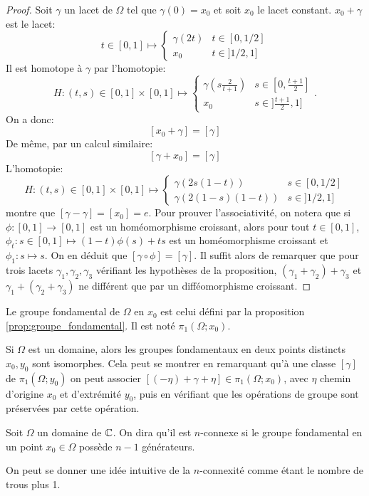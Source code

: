 \begin{proof}
Soit $\gamma$ un lacet de $\Omega$ tel que $\gamma(0)=x_0$ et soit $x_0$ le lacet constant. $x_0+\gamma$ est le lacet:
\[
t \in [0,1] \mapsto 
\begin{cases}
\gamma(2t) & t \in[0, 1/2] \\
x_0 & t \in ]1/2,1]
\end{cases}
\]
Il est homotope à $\gamma$ par l'homotopie:
\[
H \colon (t,s) \in [0,1] \times [0,1] \mapsto 
\begin{cases}
\gamma\left(s \frac{2}{t+1}\right) & s \in \left[0, \frac{t+1}{2}\right] \\
x_0 & s \in ]\frac{t+1}{2},1]
\end{cases}.
\]
On a donc:
\[
[x_0+\gamma]=[\gamma]
\]
De même, par un calcul similaire:
\[
[\gamma+x_0]=[\gamma]
\]
L'homotopie:
\[
H \colon (t,s) \in [0,1] \times [0,1] \mapsto 
\begin{cases}
\gamma\left(2s(1-t)\right) & s \in [0,1/2] \\
\gamma \left(2(1-s)(1-t)\right) & s \in ]1/2,1]
\end{cases}
\]
montre que $[\gamma-\gamma]=[x_0]=e$. Pour prouver l'associativité, on notera que si $\phi \colon [0,1] \to [0,1]$ est un homéomorphisme croissant, alors pour tout $t \in [0,1]$, $ \phi_t \colon  s\in [0,1] \mapsto (1-t)\phi(s) + ts$ est un homéomorphisme croissant et $\phi_1 \colon s \mapsto s$. On en déduit que $[\gamma \circ \phi]=[\gamma]$. Il suffit alors de remarquer que pour trois lacets $\gamma_1,\gamma_2,\gamma_3$ vérifiant les hypothèses de la proposition, $(\gamma_1+\gamma_2)+\gamma_3$ et $\gamma_1+(\gamma_2+\gamma_3)$ ne différent que par un difféomorphisme croissant.
\end{proof}
\begin{fdefn}
Le groupe fondamental de $\Omega$ en $x_0$ est celui défini par la proposition \ref{prop:groupe_fondamental}. Il est noté $\pi_1(\Omega;x_0)$.
\end{fdefn}
\begin{rem}
Si $\Omega$ est un domaine, alors les groupes fondamentaux en deux points distincts $x_0,y_0$ sont isomorphes. Cela peut se montrer en remarquant qu'à une classe $[\gamma]$ de $\pi_1(\Omega;y_0)$ on peut associer $[(-\eta)+\gamma+\eta] \in \pi_1(\Omega;x_0)$, avec $\eta$ chemin d'origine $x_0$ et d'extrémité $y_0$, puis en vérifiant que les opérations de groupe sont préservées par cette opération. 
\end{rem}

\begin{fdefn}
Soit $\Omega$ un domaine de $\mathbb{C}$. On dira qu'il est $n$-connexe si le groupe fondamental en un point $x_0 \in \Omega$ possède $n-1$ générateurs. 
\end{fdefn}
\begin{rem}
On peut se donner une idée intuitive de la $n$-connexité comme étant le nombre de \og trous \fg{} plus 1.
\end{rem}

